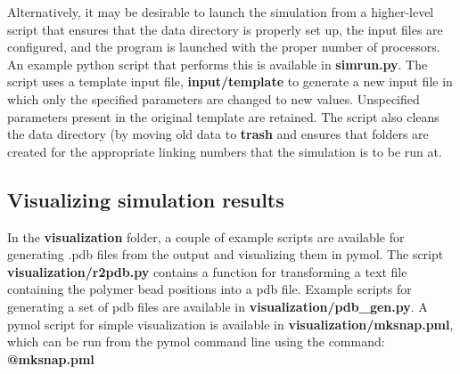 \documentclass[english]{article}
\begin{document}
\begin{itemize}
Alternatively, it may be desirable to launch the simulation from a higher-level script that ensures that the data directory is properly set up, the input files are configured, and the program is launched with the proper number of processors. An example python script that performs this is available in \textbf{simrun.py}. The script uses a template input file, \textbf{input/template} to generate a new input file in which only the specified parameters are changed to new values. Unspecified parameters present in the original template are retained. The script also cleans the data directory (by moving old data to \textbf{trash} and ensures that folders are created for the appropriate linking numbers that the simulation is to be run at.

\subsection{Visualizing simulation results}
In the \textbf{visualization} folder, a couple of example scripts are available for generating .pdb files from the output and visualizing them in pymol. The script \textbf{visualization/r2pdb.py} contains a function for transforming a text file containing the polymer bead positions into a pdb file. Example scripts for generating a set of pdb files are available in \textbf{visualization/pdb_gen.py}. A pymol script for simple visualization is available in \textbf{visualization/mksnap.pml}, which can be run from the pymol command line using the command:\\
\textbf{@mksnap.pml}


\end{itemize}
\end{document}
